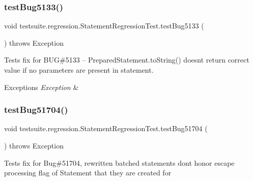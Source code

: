 \subsubsection{\texorpdfstring{test\+Bug5133()}{testBug5133()}}
{\footnotesize\ttfamily void testsuite.\+regression.\+Statement\+Regression\+Test.\+test\+Bug5133 (\begin{DoxyParamCaption}{ }\end{DoxyParamCaption}) throws Exception}

Tests fix for B\+UG\#5133 -- Prepared\+Statement.\+to\+String() doesn\textquotesingle{}t return correct value if no parameters are present in statement.


\begin{DoxyExceptions}{Exceptions}
{\em Exception} & \\
\hline
\end{DoxyExceptions}
\mbox{\label{classtestsuite_1_1regression_1_1_statement_regression_test_ae340966f884a71e95d8ff3df860c27e6}} 
\subsubsection{\texorpdfstring{test\+Bug51704()}{testBug51704()}}
{\footnotesize\ttfamily void testsuite.\+regression.\+Statement\+Regression\+Test.\+test\+Bug51704 (\begin{DoxyParamCaption}{ }\end{DoxyParamCaption}) throws Exception}

Tests fix for Bug\#51704, rewritten batched statements don\textquotesingle{}t honor escape processing flag of Statement that they are created for \mbox{\label{classtestsuite_1_1regression_1_1_statement_regression_test_a5ecea80618e2b7c9b6e3f471d5294b64}} 
